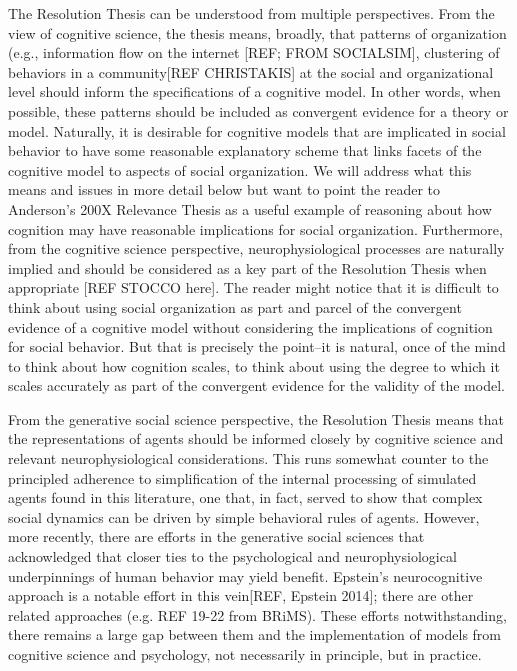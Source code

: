 \documentclass{article}
\begin{document}
The Resolution Thesis can be understood from multiple perspectives.  From the view of cognitive science, the thesis means, broadly, that patterns of organization (e.g., information flow on the internet [REF; FROM SOCIALSIM], clustering of behaviors in a community[REF CHRISTAKIS] at the social and organizational level should inform the specifications of a cognitive model.  In other words, when possible, these patterns should be included as convergent evidence for a theory or model.  Naturally, it is desirable for cognitive models that are implicated in social behavior to have some reasonable explanatory scheme that links facets of the cognitive model to aspects of social organization.   We will address what this means and issues in more detail below but want to point the reader to Anderson's 200X Relevance Thesis as a useful example of reasoning about how cognition may have reasonable implications for social organization.   Furthermore, from the cognitive science perspective, neurophysiological processes are naturally implied and should be considered as a key part of the Resolution Thesis when appropriate [REF STOCCO here].  The reader might notice that it is difficult to think about using social organization as part and parcel of the convergent evidence of a cognitive model without considering the implications of cognition for social behavior.  But that is precisely the point--it is natural, once of the mind to think about how cognition scales, to think about using the degree to which it scales accurately as part of the convergent evidence for the validity of the model.


From the generative social science perspective, the Resolution Thesis means that the representations of agents should be informed closely by cognitive science and relevant neurophysiological considerations.  This runs somewhat counter to the principled adherence to simplification of the internal processing of simulated agents found in this literature, one that, in fact, served to show that complex social dynamics can be driven by simple behavioral rules of agents.  However, more recently, there are efforts in the generative social sciences that acknowledged that closer ties to the psychological and neurophysiological underpinnings of human behavior may yield benefit.  Epstein's neurocognitive approach is a notable effort in this vein[REF, Epstein 2014]; there are other related approaches (e.g. REF 19-22 from BRiMS).  These efforts notwithstanding, there remains a large gap between them and the implementation of models from cognitive science and psychology, not necessarily in principle, but in practice.  
\end{document}
